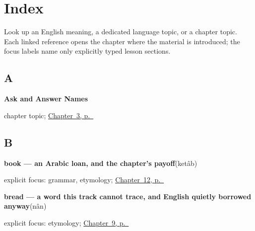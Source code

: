 
\chapter*{Index}

Look up an English meaning, a dedicated language topic, or a chapter topic. Each linked reference opens the chapter where the material is introduced; the focus labels name only explicitly typed lesson sections.

\section*{A}

\noindent\begin{minipage}[t]{\linewidth}
\raggedright
\textbf{Ask and Answer Names}\par
\footnotesize chapter topic; \hyperref[ch:fa-ask-and-answer-names]{Chapter~3, p.~\pageref*{ch:fa-ask-and-answer-names}}
\end{minipage}\par\smallskip

\section*{B}

\noindent\begin{minipage}[t]{\linewidth}
\raggedright
\textbf{book — an Arabic loan, and the chapter's payoff}\enspace\emph{}\enspace(ketâb)\par
\footnotesize explicit focus: grammar, etymology; \hyperref[ch:fa-name-heart-door-book]{Chapter~12, p.~\pageref*{ch:fa-name-heart-door-book}}
\end{minipage}\par\smallskip

\noindent\begin{minipage}[t]{\linewidth}
\raggedright
\textbf{bread — a word this track cannot trace, and English quietly borrowed anyway}\enspace\emph{}\enspace(nân)\par
\footnotesize explicit focus: etymology; \hyperref[ch:fa-please-requests]{Chapter~9, p.~\pageref*{ch:fa-please-requests}}
\end{minipage}\par\smallskip

